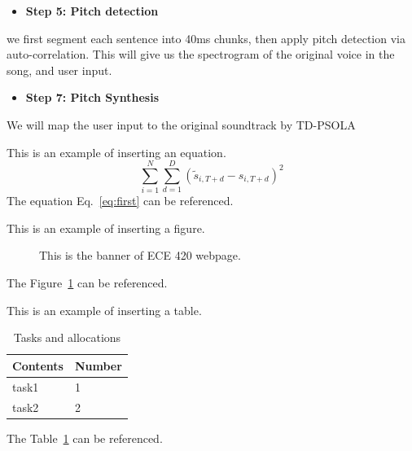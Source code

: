 \documentclass[journal,onecolumn, draftclsnofoot, 12pt]{IEEEtran}
\begin{document}
\vspace{0.5cm}
\begin{itemize}
    \item \textbf{Step 5: Pitch detection} 
\end{itemize}
\begin{description}
   we first segment each sentence into 40ms chunks, then apply pitch detection via auto-correlation. This will give us the spectrogram of the original voice in the song, and user input.
\end{description}

\vspace{0.5cm}
\begin{itemize}
    \item \textbf{Step 7: Pitch Synthesis} 
\end{itemize}
\begin{description}
   We will map the user input to the original soundtrack by TD-PSOLA
\end{description}







This is an example of inserting an equation. 
\begin{equation} \label{eq:first}
    \sum_{i=1}^N  \sum_{d=1}^D (\widetilde{s}_{i, T+d} - {s}_{i, T+d})^2
\end{equation}
The equation Eq.~\ref{eq:first} can be referenced. 


This is an example of inserting a figure. 
\begin{figure}[ht]
\begin{center}
\caption{ This is the banner of ECE 420 webpage.  } 
\label{fig:banner}
\end{center}
\end{figure}
The Figure~\ref{fig:banner} can be referenced. 


This is an example of inserting a table.
\begin{table}[h]
\small
    \centering
    \begin{tabular}{|p{1.5in}|p{1.5in}|}
        \hline
        \textbf{Contents} & \textbf{Number} \\
         \hline
        task1 &  1\\
        \hline
        task2 &  2 \\
         \hline
         
    \end{tabular}
    \vspace{0.1in}
    \caption{Tasks and allocations}
    \label{tab:table}
\end{table}
The Table~\ref{tab:table} can be referenced. 
\end{document}
